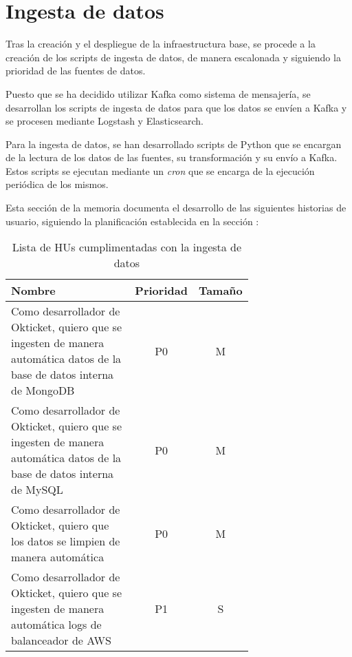 \section{Ingesta de datos}\label{sec:impl_ingesta}
Tras la creación y el despliegue de la infraestructura base, se procede a la
creación de los scripts de ingesta de datos, de manera escalonada y siguiendo
la prioridad de las fuentes de datos.

Puesto que se ha decidido utilizar Kafka como sistema de mensajería, se
desarrollan los scripts de ingesta de datos para que los datos se envíen a
Kafka y se procesen mediante Logstash y Elasticsearch.

Para la ingesta de datos, se han desarrollado scripts de Python que se encargan
de la lectura de los datos de las fuentes, su transformación y su envío a Kafka.
Estos scripts se ejecutan mediante un \textit{cron} que se encarga de la
ejecución periódica de los mismos.

Esta sección de la memoria documenta el desarrollo de las siguientes historias
de usuario, siguiendo la planificación establecida en la sección :

\begin{table}[H]
	\centering
	\begin{tabular}{|p{0.7\linewidth}|c|c|}
		\hline
		\textbf{Nombre} & \textbf{Prioridad} & \textbf{Tamaño} \\
		\hline
		\hline
		Como desarrollador de Okticket, quiero que se ingesten de manera automática datos de la base de datos interna de MongoDB & P0\cellcolor{red!50} & M\cellcolor{yellow!50} \\
		\hline
		Como desarrollador de Okticket, quiero que se ingesten de manera automática datos de la base de datos interna de MySQL & P0\cellcolor{red!50} & M\cellcolor{yellow!50} \\
		\hline
		Como desarrollador de Okticket, quiero que los datos se limpien de manera automática & P0\cellcolor{red!50} & M\cellcolor{yellow!50} \\
		\hline
		Como desarrollador de Okticket, quiero que se ingesten de manera automática logs de balanceador de AWS & P1\cellcolor{orange!50} & S\cellcolor{green!25} \\
		\hline
  \end{tabular}
  \caption{Lista de HUs cumplimentadas con la ingesta de datos}
  \label{tab:impl_ingesta}
\end{table}

